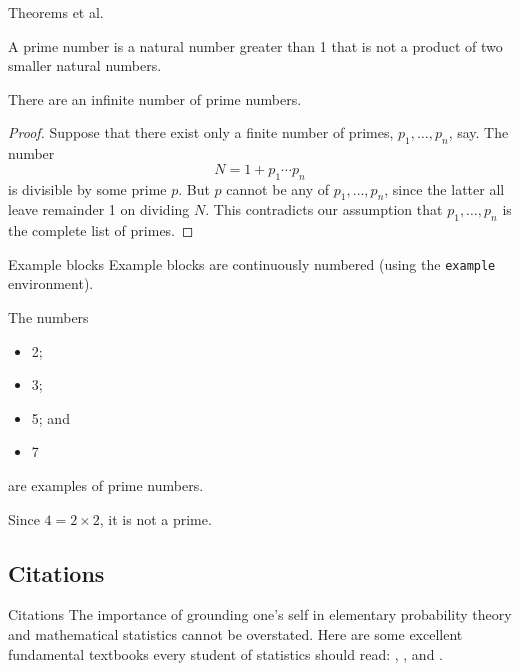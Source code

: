 \documentclass[,aspectratio=43]{beamer}
\providecommand{\tightlist}{%
  \setlength{\itemsep}{0pt}\setlength{\parskip}{0pt}}
\begin{document}
\begin{frame}{Theorems et al.}
\protect\hypertarget{theorems-et-al.}{}
\begin{definition}
A prime number is a natural number greater than 1 that is not a product
of two smaller natural numbers.
\end{definition}

\begin{theorem}
There are an infinite number of prime numbers.
\end{theorem}

\begin{proof}
Suppose that there exist only a finite number of primes,
\(p_1,\dots,p_n\), say. The number \[
N = 1+p_1\cdots p_n
\] is divisible by some prime \(p\). But \(p\) cannot be any of
\(p_1,\dots,p_n\), since the latter all leave remainder 1 on dividing
\(N\). This contradicts our assumption that \(p_1,\dots,p_n\) is the
complete list of primes.
\end{proof}
\end{frame}

\begin{frame}[fragile]{Example blocks}
\protect\hypertarget{example-blocks}{}
Example blocks are continuously numbered (using the \texttt{example}
environment).

\begin{example}
The numbers

\begin{itemize}
\tightlist
\item
  2;
\item
  3;
\item
  5; and
\item
  7
\end{itemize}

are examples of prime numbers.
\end{example}

\begin{example}
Since \(4 = 2 \times 2\), it is not a prime.
\end{example}
\end{frame}

\hypertarget{citations}{%
\subsection{Citations}\label{citations}}

\begin{frame}{Citations}
The importance of grounding one's self in elementary probability theory
and mathematical statistics cannot be overstated. Here are some
excellent fundamental textbooks every student of statistics should read:
\textcite{casella2002statistical}, \textcite{pawitan2001all}, and
\textcite{wasserman2013all}.

\end{frame}
\end{document}
